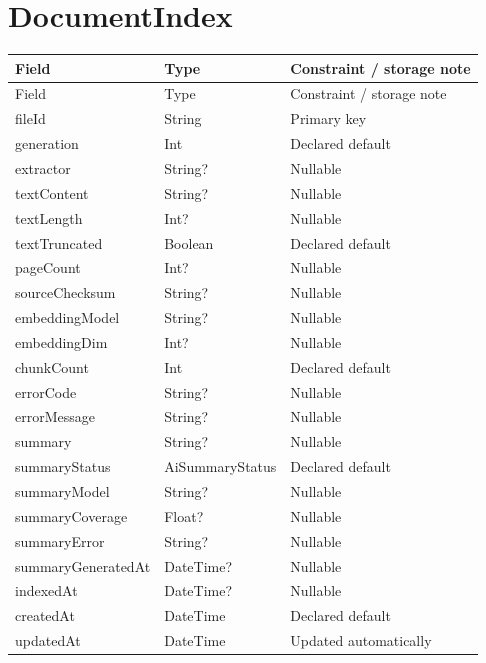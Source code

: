 \documentclass[11pt,a4paper,oneside]{report}
\begin{document}
\section{DocumentIndex}
\begin{longtable}{p{.31\linewidth}p{.23\linewidth}p{.36\linewidth}}\toprule Field&Type&Constraint / storage note\\\midrule\endfirsthead\toprule Field&Type&Constraint / storage note\\\midrule\endhead
fileId&String&Primary key\\
generation&Int&Declared default\\
extractor&String?&Nullable\\
textContent&String?&Nullable\\
textLength&Int?&Nullable\\
textTruncated&Boolean&Declared default\\
pageCount&Int?&Nullable\\
sourceChecksum&String?&Nullable\\
embeddingModel&String?&Nullable\\
embeddingDim&Int?&Nullable\\
chunkCount&Int&Declared default\\
errorCode&String?&Nullable\\
errorMessage&String?&Nullable\\
summary&String?&Nullable\\
summaryStatus&AiSummaryStatus&Declared default\\
summaryModel&String?&Nullable\\
summaryCoverage&Float?&Nullable\\
summaryError&String?&Nullable\\
summaryGeneratedAt&DateTime?&Nullable\\
indexedAt&DateTime?&Nullable\\
createdAt&DateTime&Declared default\\
updatedAt&DateTime&Updated automatically\\
\bottomrule\end{longtable}
\end{document}
